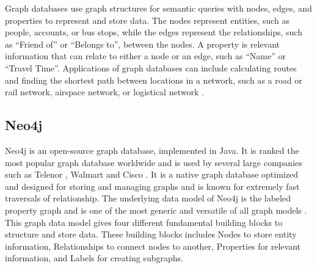 

Graph databases use graph structures for semantic queries with nodes, edges, and properties to represent and store data.
The nodes represent entities, such as people, accounts, or bus stops, while the edges represent the relationships, such as ``Friend of'' or ``Belongs to'', between the nodes. A property is relevant information that can relate to either a node or an edge, such as ``Name'' or ``Travel Time''.
Applications of graph databases can include calculating routes and finding the shortest path between locations in a network, such as a road or rail network, airspace network, or logistical network \citep[p.102]{robinson13}. 

\subsection{Neo4j}
\label{subsubsec:neo4j}
Neo4j \citep{website:neo4j} is an open-source graph database, implemented in Java. It is ranked the most popular graph database worldwide \citep{website:graphdbranking} and is used by several large companies such as Telenor \citep{website:telenor}, Walmart \citep{website:walmart} and Cisco \citep{website:cisco}. It is a native graph database optimized and designed for storing and managing graphs and is known for extremely fast traversals of relationship. The underlying data model of Neo4j is the labeled property graph and is one of the most generic and versatile of all graph models \citep[p.73]{robinson13}. This graph data model gives four different fundamental building blocks to structure and store data. These building blocks includes Nodes to store entity information, Relationships to connect nodes to another, Properties for relevant information, and Labels for creating subgraphs.

